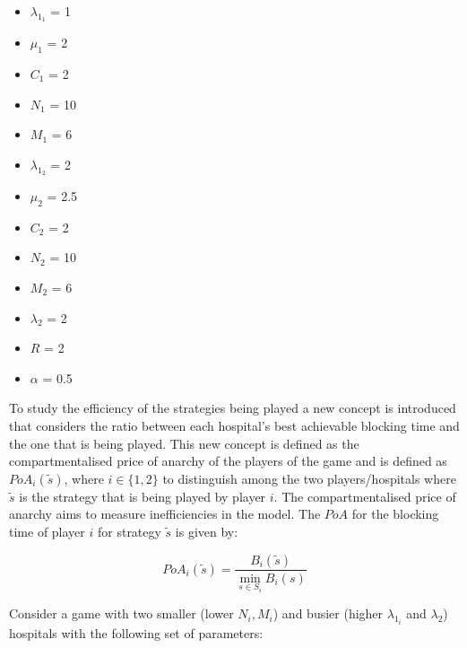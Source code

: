 \begin{multicols}{3}
    \begin{itemize}
        \item \( \lambda_{1_1} \) = 1
        \item \( \mu_1 \) = 2
        \item \( C_1 \) = 2
        \item \( N_1 \) = 10
        \item \( M_1 \) = 6

        \columnbreak
        \item \( \lambda_{1_2} \) = 2
        \item \( \mu_2 \) = 2.5
        \item \( C_2 \) = 2
        \item \( N_2 \) = 10
        \item \( M_2 \) = 6
        
        \columnbreak
        \item \( \lambda_2 \) = 2
        \item \( R \) = 2
        \item \( \alpha \) = 0.5
    \end{itemize}
\end{multicols}

To study the efficiency of the strategies being played a new concept is 
introduced that considers the ratio between each hospital's best achievable 
blocking time and the one that is being played.
This new concept is defined as the compartmentalised price of anarchy of the 
players of the game and is defined as \(PoA_i(\tilde{s})\), where 
\(i \in \{1, 2\}\) to distinguish among the two players/hospitals where 
\(\tilde{s}\) is the strategy that is being played by player \( i \). 
The compartmentalised price of anarchy aims to measure inefficiencies in the 
model.
The \(PoA\) for the blocking time of player \(i\) for strategy \(\tilde{s}\) 
is given by:

\begin{equation}\label{eq:poa_compartmentalised}
    PoA_{i}(\tilde{s}) = \frac{B_i(\tilde{s})}{\min_{s \in S_i} B_i(s)}
\end{equation}

Consider a game with two smaller (lower \( N_i, M_i \)) and busier (higher 
\(\lambda_{1_i} \) and \(\lambda_2\)) hospitals with the following set of 
parameters:

